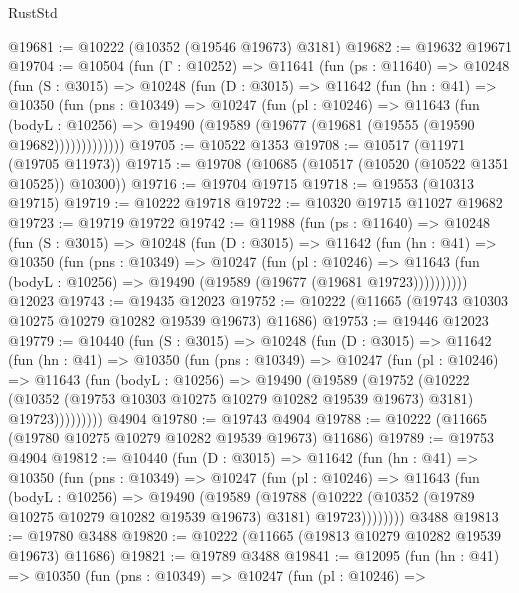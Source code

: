 \begin{lexlean}{RustStd}
\begin{coremodule}
@19681 := @10222 (@10352 (@19546 @19673) @3181)
@19682 := @19632 @19671
@19704 := @10504
    (fun (Γ : @10252) =>
    @11641
      (fun (ps : @11640) =>
      @10248
        (fun (S : @3015) =>
        @10248
          (fun (D : @3015) =>
          @11642
            (fun (hn : @41) =>
            @10350
              (fun (pns : @10349) =>
              @10247
                (fun (pl : @10246) =>
                @11643
                  (fun (bodyL : @10256) =>
                  @19490 (@19589 (@19677 (@19681 (@19555 (@19590 @19682)))))))))))))
@19705 := @10522 @1353
@19708 := @10517 (@11971 (@19705 @11973))
@19715 := @19708 (@10685 (@10517 (@10520 (@10522 @1351 @10525)) @10300))
@19716 := @19704 @19715
@19718 := @19553 (@10313 @19715)
@19719 := @10222 @19718
@19722 := @10320 @19715 @11027 @19682
@19723 := @19719 @19722
@19742 := @11988
    (fun (ps : @11640) =>
    @10248
      (fun (S : @3015) =>
      @10248
        (fun (D : @3015) =>
        @11642
          (fun (hn : @41) =>
          @10350
            (fun (pns : @10349) =>
            @10247
              (fun (pl : @10246) =>
              @11643 (fun (bodyL : @10256) => @19490 (@19589 (@19677 (@19681 @19723))))))))))
    @12023
@19743 := @19435 @12023
@19752 := @10222 (@11665 (@19743 @10303 @10275 @10279 @10282 @19539 @19673) @11686)
@19753 := @19446 @12023
@19779 := @10440
    (fun (S : @3015) =>
    @10248
      (fun (D : @3015) =>
      @11642
        (fun (hn : @41) =>
        @10350
          (fun (pns : @10349) =>
          @10247
            (fun (pl : @10246) =>
            @11643
              (fun (bodyL : @10256) =>
              @19490
                (@19589
                  (@19752
                    (@10222
                      (@10352 (@19753 @10303 @10275 @10279 @10282 @19539 @19673) @3181)
                      @19723)))))))))
    @4904
@19780 := @19743 @4904
@19788 := @10222 (@11665 (@19780 @10275 @10279 @10282 @19539 @19673) @11686)
@19789 := @19753 @4904
@19812 := @10440
    (fun (D : @3015) =>
    @11642
      (fun (hn : @41) =>
      @10350
        (fun (pns : @10349) =>
        @10247
          (fun (pl : @10246) =>
          @11643
            (fun (bodyL : @10256) =>
            @19490
              (@19589
                (@19788
                  (@10222 (@10352 (@19789 @10275 @10279 @10282 @19539 @19673) @3181) @19723))))))))
    @3488
@19813 := @19780 @3488
@19820 := @10222 (@11665 (@19813 @10279 @10282 @19539 @19673) @11686)
@19821 := @19789 @3488
@19841 := @12095
    (fun (hn : @41) =>
    @10350
      (fun (pns : @10349) =>
      @10247
        (fun (pl : @10246) =>

\end{coremodule}
\end{lexlean}

